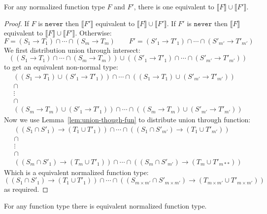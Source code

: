 \documentclass[acmsmall,review,screen]{acmart}
\newcommand{\NEVER}{\mathtt{never}}
\newcommand{\fun}{\mathbin{\rightarrow}}
\newcommand{\sem}[1]{\llbracket{#1}\rrbracket}
\begin{document}
\begin{lemma} \label{lem:funun}
  For any normalized function type $F$ and $F'$,
  there is one equivalent to
  $\sem{F} \cup \sem{F'}$.
\end{lemma}

\begin{proof}
  If $F$ is $\NEVER$ then $\sem{F'}$ equivalent to $\sem{F} \cup \sem{F'}$.
  If $F'$ is $\NEVER$ then $\sem{F}$ equivalent to $\sem{F} \cup \sem{F'}$.
  Otherwise:
  \[
    F = (S_1 \fun T_1) \cap \cdots \cap (S_{m} \fun T_{m})
  \qquad
    F' = (S'_1 \fun T'_1) \cap \cdots \cap (S'_{m'} \fun T'_{m'})
  \]
  We first distribution union through intersect:
  \[
    ((S_1 \fun T_1) \cap \cdots \cap (S_{m} \fun T_{m}))
    \cup
    ((S'_1 \fun T'_1) \cap \cdots \cap (S'_{m'} \fun T'_{m'}))
  \]
  to get an equivalent non-normal type:
  \[\begin{array}{c}
    ((S_{1} \fun T_{1}) \cup (S'_{1} \fun T'_{1}))
    \cap \cdots \cap
    ((S_{1} \fun T_{1}) \cup (S'_{m'} \fun T'_{m'}))
    \\
    \cap
    \\
    \vdots
    \\
    \cap
    \\
    ((S_{m} \fun T_{m}) \cup (S'_{1} \fun T'_{1}))
    \cap \cdots \cap
    ((S_{m} \fun T_{m}) \cup (S'_{m'} \fun T'_{m'}))
  \end{array}\]
  Now we use Lemma~\ref{lem:union-though-fun} to distribute union through function:
  \[\begin{array}{c}
    ((S_{1} \cap S'_{1}) \fun (T_{1} \cup T'_{1}))
    \cap \cdots \cap
    ((S_{1} \cap S'_{m'}) \fun (T_{1} \cup T'_{m'}))
    \\
    \cap
    \\
    \vdots
    \\
    \cap
    \\
    ((S_{m} \cap S'_{1}) \fun (T_{m} \cup T'_{1}))
    \cap \cdots \cap
    ((S_{m} \cap S'_{m'}) \fun (T_{m} \cup T'_{m**}))
  \end{array}\]
  Which is a equivalent normalized function type:
  \[
    ((S_{1} \cap S'_{1}) \fun (T_{1} \cup T'_{1}))
    \cap \cdots \cap
    ((S_{m \times m'} \cap S'_{m \times m'}) \fun (T_{m \times m'} \cup T'_{m \times m'}))
  \]
  as required.
\end{proof}

\begin{lemma} \label{lem:funnord}
  For any function type there is equivalent normalized function type.
\end{lemma}
\end{document}
